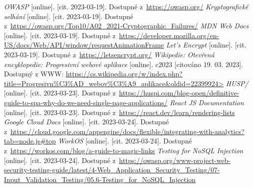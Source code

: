 \begin{thebibliography}{99}
     \textit{OWASP} [online]. [cit. 2023-03-19]. Dostupné z~\url{https://owasp.org/}
     \textit{Kryptografické selhání} [online]. [cit. 2023-03-19]. Dostupné z~\url{https://owasp.org/Top10/A02_2021-Cryptographic_Failures/}
     \textit{MDN Web Docs} [online]. [cit. 2023-03-19]. Dostupné z~\url{https://developer.mozilla.org/en-US/docs/Web/API/window/requestAnimationFrame}
     \textit{Let's Encrypt} [online]. [cit. 2023-03-19]. Dostupné z~\url{https://letsencrypt.org/}
     \textit{Wikipedie: Otevřená encyklopedie: Progresivní webové aplikace} [online]. c2023 [citováno 19. 03. 2023]. Dostupný z WWW: \url{https://cs.wikipedia.org/w/index.php?title=Progresivn%C3%AD_webov%C3%A9_aplikace&oldid=22399924>}
     \textit{HUSP/} [online]. [cit. 2023-03-23]. Dostupné z~\url{https://huspi.com/blog-open/definitive-guide-to-spa-why-do-we-need-single-page-applications/}
     \textit{React JS Documentation} [online]. [cit. 2023-03-23]. Dostupné z~\url{https://react.dev/learn/rendering-lists}
     \textit{Google Cloud Docs} [online]. [cit. 2023-03-24]. Dostupné z~\url{https://cloud.google.com/appengine/docs/flexible/integrating-with-analytics?tab=node.js#top}
     \textit{WorkOS} [online]. [cit. 2023-03-24]. Dostupné z~\url{https://workos.com/blog/a-guide-to-magic-links}
     \textit{Testing for NoSQL Injection} [online]. [cit. 2023-03-24]. Dostupné z~\url{https://owasp.org/www-project-web-security-testing-guide/latest/4-Web_Application_Security_Testing/07-Input_Validation_Testing/05.6-Testing_for_NoSQL_Injection}
\end{thebibliography}